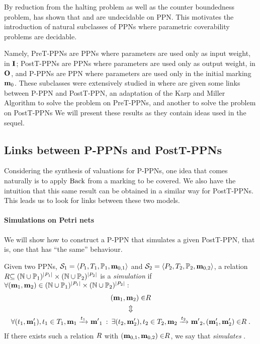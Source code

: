 By reduction from the halting problem as well as the counter boundedness problem, \cite{David17} has shown that \Ucov and \Ecov are undecidable on \ac{PPN}.
This motivates the introduction of natural subclasses of \acp{PPN} where parametric coverability problems are decidable.

Namely,
PreT-PPNs are \acp{PPN} where parameters are used only as input weight, \ie in $\inm$;
PostT-PPNs are \acp{PPN} where parameters are used only as output weight, \ie in $\outm$,
and P-PPNs are \ac{PPN} where parameters are used only in the initial marking $\mathbf{m}_0$.
These subclasses were extensively studied in \cite{David17} where are given
some links between P-PPN and PostT-PPN,
an adaptation of the Karp and Miller Algorithm to solve the \Ucov problem on PreT-\acp{PPN},
and another to solve the \Ecov problem on PostT-\acp{PPN}%
We will present these results as they contain ideas used in the sequel.

\subsection{Links between P-PPNs and PostT-PPNs}
\label{sec:p-ppn-and-postt-ppn}

Considering the synthesis of valuations for P-PPNs, one idea that comes naturally is to apply $\operatorname{Back}$ from a marking to be covered.
We also have the intuition that this same result can be obtained in a similar way for PostT-PPNs.
This leads us to look for links between these two models.

\paragraph{Simulations on Petri nets}
\label{sec:postt-ppn-to-p-ppn}

We will show how to construct a P-PPN that simulates a given PostT-PPN, that is, one that has ``the same'' behaviour.

\begin{defi}
  Given two \acp{PPN}, $\defPPN[1]$ and $\defPPN[2]$, a relation $\mathrel{R} \subseteq (\mathbb{N} \cup  \mathbb{P}_1)^{\left|P_1\right|} \times (\mathbb{N} \cup  \mathbb{P}_2)^{\left|P_2\right|}$ is a \emph{simulation} if $\forall (\mathbf{m}_1, \mathbf{m}_2) \in (\mathbb{N} \cup  \mathbb{P}_1)^{\left|P_1\right|} \times (\mathbb{N} \cup  \mathbb{P}_2)^{\left|P_2\right|} : $
  \begin{gather*}
    (\mathbf{m}_1, \mathbf{m}_2) \in \mathrel{R} \\
    \Updownarrow\\
    \forall (t_1,\mathbf{m}'_1), t_1 \in T_1, \mathbf{m}_1 \xrightarrow{t_1}_{} \mathbf{m'}_1 \>:\>
    \exists (t_2,\mathbf{m}'_2), t_2 \in T_2, \mathbf{m}_2 \xrightarrow{t_2}_{} \mathbf{m'}_2, (\mathbf{m}'_1, \mathbf{m}'_2) \in \mathrel{R}.
  \end{gather*}
  If there exists such a relation $\mathrel{R}$ with $(\mathbf{m}_{0,1}, \mathbf{m}_{0,2}) \in \mathrel{R}$, we say that \namePPN[2] \emph{simulates} \namePPN[1].
\end{defi}

